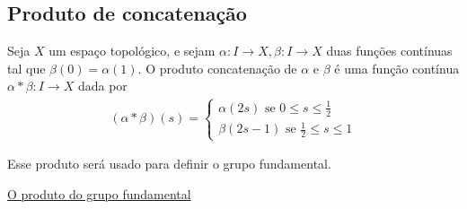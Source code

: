 \subsection{Produto de concatenação}
\label{Produto-grupo-fundamental-def}
\begin{defi}
	Seja $X$ um espaço topológico, e sejam $\alpha:I\rightarrow X, \beta:I\rightarrow X$ duas funções contínuas tal que $\beta(0)=\alpha(1).$ O produto concatenação de $\alpha$ e $\beta$ é uma função contínua $\alpha*\beta:I\rightarrow X$ dada por 
 \begin{align*}
     (\alpha*\beta)(s)=\begin{cases}
         \alpha(2s)\mbox{ se }0\le s\le\frac{1}{2}\\
         \beta(2s-1)\mbox{ se }\frac{1}{2}\le s \le 1
     \end{cases}
 \end{align*}
\end{defi}

Esse produto será usado para definir o grupo fundamental.

	\item \hyperref[produto-bem-definido-prop]{O produto do grupo fundamental}

